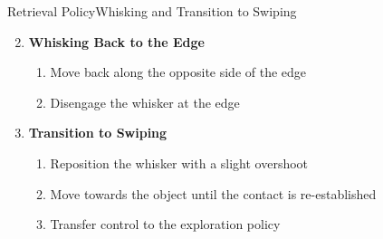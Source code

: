 \documentclass[AIRbeamer
,optEnglish
,optBiber
,optBibstyleAlphabetic
,optBeamerClassicFormat%
]{AIRlatex}
\begin{document}
    \begin{frame}{Retrieval Policy}{Whisking and Transition to Swiping}
        \begin{enumerate}
            \setcounter{enumi}{1}
            \item \textbf{Whisking Back to the Edge}
            \begin{enumerate}
                \item Move back along the opposite side of the edge
                \item Disengage the whisker at the edge
            \end{enumerate}
            \item \textbf{Transition to Swiping}
            \begin{enumerate}
                \item Reposition the whisker with a slight overshoot
                \item Move towards the object until the contact is re-established
                \item Transfer control to the exploration policy
            \end{enumerate}
        \end{enumerate}
    \end{frame}
\end{document}
